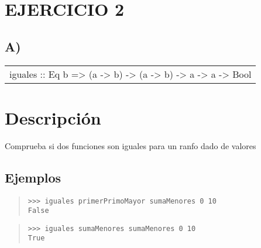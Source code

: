 \section{EJERCICIO 2}
\subsection{A)}
\begin{haddockdesc}
\item[\begin{tabular}{@{}l}
iguales :: Eq b => (a -> b) -> (a -> b) -> a -> a -> Bool
\end{tabular}]
{\haddockbegindoc
\section*{Descripción}
Comprueba si dos funciones son iguales para un ranfo dado de valores\par
\subsection*{Ejemplos}
\begin{quote}
{\haddockverb\begin{verbatim}
>>> iguales primerPrimoMayor sumaMenores 0 10
False

\end{verbatim}}
\end{quote}
\begin{quote}
{\haddockverb\begin{verbatim}
>>> iguales sumaMenores sumaMenores 0 10
True

\end{verbatim}}
\end{quote}}
\end{haddockdesc}
